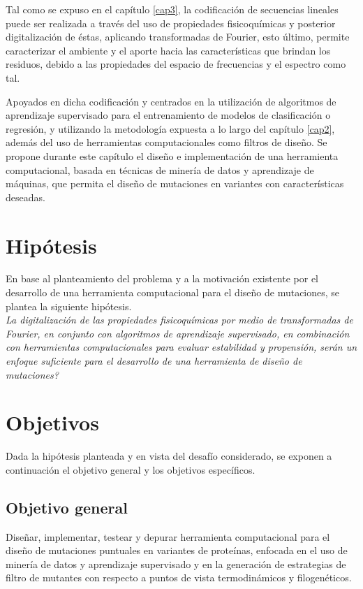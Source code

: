 Tal como se expuso en el capítulo \ref{cap3}, la codificación de secuencias lineales puede ser realizada a través del uso de propiedades fisicoquímicas y posterior digitalización de éstas, aplicando transformadas de Fourier, esto último, permite caracterizar el ambiente y el aporte hacia las características que brindan los residuos, debido a las propiedades del espacio de frecuencias y el espectro como tal. 

Apoyados en dicha codificación y centrados en la utilización de algoritmos de aprendizaje supervisado para el entrenamiento de modelos de clasificación o regresión, y utilizando la metodología expuesta a lo largo del capítulo \ref{cap2}, además del uso de herramientas computacionales como filtros de diseño. Se propone durante este capítulo el diseño e implementación de una herramienta computacional, basada en técnicas de minería de datos y aprendizaje de máquinas, que permita el diseño de mutaciones en variantes con características deseadas.

\section{Hipótesis}

En base al planteamiento del problema y a la motivación existente por el desarrollo de una herramienta computacional para el diseño de mutaciones, se plantea la siguiente hipótesis.\\

\textit{La digitalización de las propiedades fisicoquímicas por medio de transformadas de Fourier, en conjunto con algoritmos de aprendizaje supervisado, en combinación con herramientas computacionales para evaluar estabilidad y propensión, serán un enfoque suficiente para el desarrollo de una herramienta de diseño de mutaciones?}

\section{Objetivos}

Dada la hipótesis planteada y en vista del desafío considerado, se exponen a continuación el objetivo general y los objetivos específicos.

\subsection{Objetivo general}

Diseñar, implementar, testear y depurar herramienta computacional para el diseño de mutaciones puntuales en variantes de proteínas, enfocada en el uso de minería de datos y aprendizaje supervisado y en la generación de estrategias de filtro de mutantes con respecto a puntos de vista termodinámicos y filogenéticos.

